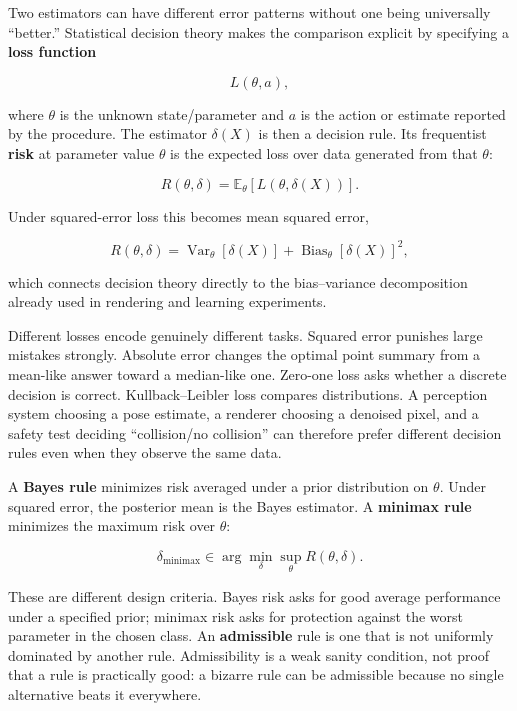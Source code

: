 \hypertarget{02-foundations-ii-ch030-decision-theory-separates-an-estimator-from-the-consequences-of-being-wrong}{}

Two estimators can have different error patterns without one being universally ``better.'' Statistical decision theory makes the comparison explicit by specifying a \textbf{loss function}

\[
L(\theta,a),
\]

where \(\theta\) is the unknown state/parameter and \(a\) is the action or estimate reported by the procedure. The estimator \(\delta(X)\) is then a decision rule. Its frequentist \textbf{risk} at parameter value \(\theta\) is the expected loss over data generated from that \(\theta\):

\[
R(\theta,\delta)
=
\mathbb E_\theta[
L(\theta,\delta(X))
].
\]

Under squared-error loss this becomes mean squared error,

\[
R(\theta,\delta)
=
\operatorname{Var}_\theta[\delta(X)]
+
\operatorname{Bias}_\theta[\delta(X)]^2,
\]

which connects decision theory directly to the bias--variance decomposition already used in rendering and learning experiments.

Different losses encode genuinely different tasks. Squared error punishes large mistakes strongly. Absolute error changes the optimal point summary from a mean-like answer toward a median-like one. Zero-one loss asks whether a discrete decision is correct. Kullback--Leibler loss compares distributions. A perception system choosing a pose estimate, a renderer choosing a denoised pixel, and a safety test deciding ``collision/no collision'' can therefore prefer different decision rules even when they observe the same data.

A \textbf{Bayes rule} minimizes risk averaged under a prior distribution on \(\theta\). Under squared error, the posterior mean is the Bayes estimator. A \textbf{minimax rule} minimizes the maximum risk over \(\theta\):

\[
\delta_{\mathrm{minimax}}
\in
\arg\min_\delta
\sup_{\theta}R(\theta,\delta).
\]

These are different design criteria. Bayes risk asks for good average performance under a specified prior; minimax risk asks for protection against the worst parameter in the chosen class. An \textbf{admissible} rule is one that is not uniformly dominated by another rule. Admissibility is a weak sanity condition, not proof that a rule is practically good: a bizarre rule can be admissible because no single alternative beats it everywhere.

